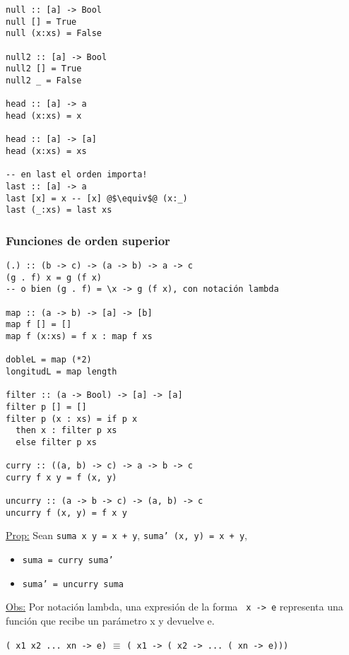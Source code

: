 \documentclass[12pt]{extarticle}
\def\propiedad{\underline{Prop:} }
\def\observacion{\underline{Obs:} }
\newcommand\hsline[1]{\texttt{#1}}
\begin{document}
\begin{verbatim}
null :: [a] -> Bool
null [] = True
null (x:xs) = False

null2 :: [a] -> Bool
null2 [] = True
null2 _ = False

head :: [a] -> a
head (x:xs) = x

head :: [a] -> [a]
head (x:xs) = xs

-- en last el orden importa!
last :: [a] -> a
last [x] = x -- [x] @$\equiv$@ (x:_)
last (_:xs) = last xs 
\end{verbatim}

\subsubsection{Funciones de orden superior}
\begin{verbatim}
(.) :: (b -> c) -> (a -> b) -> a -> c
(g . f) x = g (f x)
-- o bien (g . f) = \x -> g (f x), con notación lambda

map :: (a -> b) -> [a] -> [b]
map f [] = []
map f (x:xs) = f x : map f xs

dobleL = map (*2)
longitudL = map length

filter :: (a -> Bool) -> [a] -> [a]
filter p [] = []
filter p (x : xs) = if p x 
  then x : filter p xs 
  else filter p xs

curry :: ((a, b) -> c) -> a -> b -> c
curry f x y = f (x, y)

uncurry :: (a -> b -> c) -> (a, b) -> c
uncurry f (x, y) = f x y
\end{verbatim}

\propiedad Sean \hsline{suma x y = x + y}, \hsline{suma' (x, y) = x + y},
\begin{itemize}
\vspace{-0.2cm}
\setlength\itemsep{-0.4em}
  \item \hsline{suma = curry suma'}
  \item \hsline{suma' = uncurry suma}
\end{itemize}

\observacion Por notación lambda, una expresión de la forma 
\texttt{\ x -> e}
representa una función que recibe un parámetro x y devuelve e. \\
\vspace{-0.5cm}
\begin{center}
\texttt{(\ x1 x2 ... xn -> e)} $\equiv$ \texttt{(\ x1 -> (\ x2 -> ... (\ xn -> e)))}
\end{center}
\end{document}

